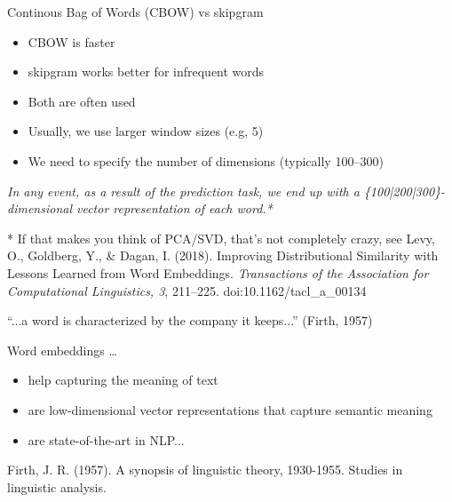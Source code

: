 \documentclass{beamer}
\begin{document}
\begin{frame}{Continous Bag of Words (CBOW) vs skipgram}
\begin{itemize}
	\item CBOW is faster
	\item skipgram works better for infrequent words
	\item Both are often used
	\item Usually, we use larger window sizes (e.g, 5)
	\item We need to specify the number of dimensions (typically 100--300)
\end{itemize}
\pause

\textit{In any event, as a result of the prediction task, we end up with a \{100|200|300\}-dimensional vector representation of each word.*}



\tiny{* If that makes you think of PCA/SVD, that's not completely crazy, see Levy, O., Goldberg, Y., \& Dagan, I. (2018). Improving Distributional Similarity with Lessons Learned from Word Embeddings. \textit{Transactions of the Association for Computational Linguistics, 3}, 211--225. doi:10.1162/tacl\_a\_00134}\\
\end{frame}


\begin{frame}{``...a word is characterized by the company it keeps...'' (Firth, 1957)}
\begin{block}{Word embeddings \ldots}
	\begin{itemize}
		\item help capturing the meaning of text
		\item are low-dimensional vector representations that capture semantic meaning
		\item are state-of-the-art in NLP...
	\end{itemize}
\end{block}

\tiny{Firth, J. R. (1957). A synopsis of linguistic theory, 1930-1955. Studies in linguistic analysis.}
\end{frame}

\end{document}
